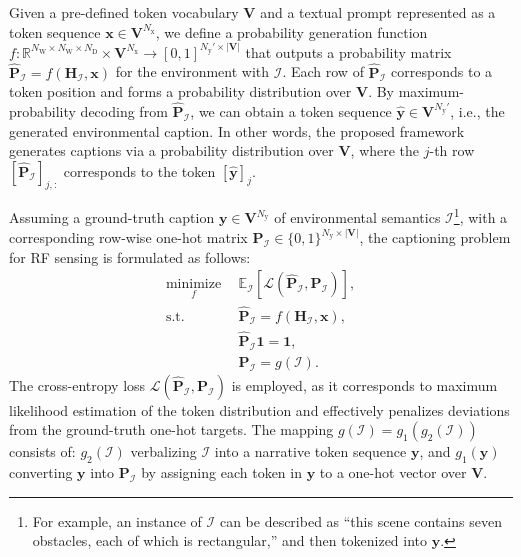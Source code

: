 \documentclass[journal,12pt,onecolumn,draftclsnofoot]{IEEEtran}
\newcommand\IC{\ensuremath{\mathcal{I}}}
\newcommand\LC{\ensuremath{\mathcal{L}}}
\newcommand\PB{\ensuremath{\bm{P}}}
\newcommand\xB{\ensuremath{\bm{x}}}
\newcommand\yB{\ensuremath{\bm{y}}}
\newcommand\HF{\ensuremath{\mathbf{H}}}
\newcommand\VF{\ensuremath{\mathbf{V}}}
\newcommand\oneF{\ensuremath{{\mathbf 1}}}
\newcommand\DR{\ensuremath{\mathrm{D}}}
\newcommand\WR{\ensuremath{\mathrm{W}}}
\newcommand\xR{\ensuremath{\mathrm{x}}}
\newcommand\yR{\ensuremath{\mathrm{y}}}
\newcommand\Rb{\ensuremath{\mathbb{R}}}
\newcommand{\wh}{\widehat}
\begin{document}
Given a pre-defined token vocabulary $\VF$ and a textual prompt represented as a token sequence $\xB\in\VF^{N_{\xR}}$, we define a probability generation function $f\!:\! \Rb^{N_{\WR}\times N_{\WR}\times N_{\DR}} \!\times\! \VF^{N_{\xR}}\!\!\to\!\! [0,1]^{N_{\yR}'\times|\VF|}$ that outputs a probability matrix $\wh{\PB}_{\IC}=f(\HF_{\IC},\xB)$ for the environment with $\IC$. Each row of $\wh{\PB}_{\IC}$ corresponds to a token position and forms a probability distribution over $\VF$.  By maximum-probability decoding from $\wh{\PB}_{\IC}$, we can obtain a token sequence $\wh{\yB}\in\VF^{N_{\yR}'}$, i.e., the generated environmental caption. In other words, the proposed framework generates captions via a probability distribution over $\VF$, where the $j$-th row $[\wh{\PB}_{\IC}]_{j,:}$ corresponds to the token $[\wh{\yB}]_{j}$. 


Assuming a ground-truth caption $\yB\in\VF^{N_{\yR}}$ of environmental semantics $\IC$\footnote{For example, an instance of $\IC$ can be described as “this scene contains seven obstacles, each of which is rectangular,” and then tokenized into $\yB$.}, with a corresponding row-wise one-hot matrix $\PB_{\IC}\in\{0,1\}^{N_{\yR}\times|\VF|}$, the captioning problem for RF sensing is formulated as follows:
\begin{subequations}\label{construction}
\begin{align}
	\underset{f}{\mathrm{minimize}}~~&\mathbb{E}_{\IC}\!\left[\LC\left(\wh{\PB}_{\IC},\PB_{\IC}\right)\right], \label{const:2a} \\
	\text{s.t.}~~& \wh{\PB}_{\IC}=f(\HF_{\IC},\xB), \label{const:2d}\\
	& \wh{\PB}_{\IC}\oneF=\oneF, \label{const:2f}\\
	& \PB_{\IC}=g(\IC). \label{const:2b}
\end{align}
\end{subequations} The cross-entropy loss $\LC(\wh{\PB}_{\IC},\PB_{\IC})$ is employed, as it corresponds to maximum likelihood estimation of the token distribution and effectively penalizes deviations from the ground-truth one-hot targets. The mapping $g(\IC)=g_1(g_2(\IC))$ consists of: $g_2(\IC)$ verbalizing $\IC$ into a narrative token sequence $\yB$, and $g_1(\yB)$ converting $\yB$ into $\PB_{\IC}$ by assigning each token in $\yB$ to a one-hot vector over $\VF$.
\end{document}
